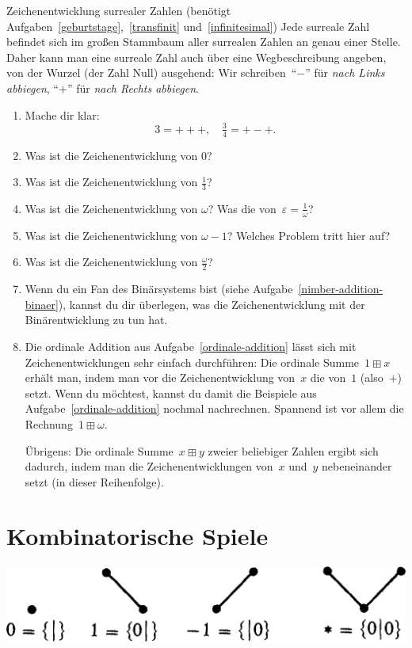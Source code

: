 \documentclass{../zirkelblatt}
\newcommand{\head}[1]{\section*{\rmfamily #1}}%
\begin{document}
\begin{aufgabe}{Zeichenentwicklung surrealer Zahlen
(benötigt Aufgaben~\ref{geburtstage},~\ref{transfinit}
und~\ref{infinitesimal})}
Jede surreale Zahl befindet sich im großen Stammbaum aller surrealen Zahlen an
genau einer Stelle. Daher kann man eine surreale Zahl auch über eine
Wegbeschreibung angeben, von der Wurzel (der Zahl Null) ausgehend: Wir
schreiben~"`$-$"' für \emph{nach Links abbiegen}, "`$+$"' für \emph{nach Rechts
abbiegen}.
\begin{enumerate}
\item Mache dir klar:
\[ 3 = {+}{+}{+}, \quad \tfrac{3}{4} = {+}{-}{+}. \]
\item Was ist die Zeichenentwicklung von $0$?
\item Was ist die Zeichenentwicklung von $\tfrac{1}{3}$?
\item Was ist die Zeichenentwicklung von $\omega$? Was die von~$\varepsilon =
\tfrac{1}{\omega}$?
\item Was ist die Zeichenentwicklung von $\omega-1$? Welches Problem tritt hier
auf?
\item Was ist die Zeichenentwicklung von $\tfrac{\omega}{2}$?
\item Wenn du ein Fan des Binärsystems bist (siehe
Aufgabe~\ref{nimber-addition-binaer}), kannst du dir überlegen, was die
Zeichenentwicklung mit der Binärentwicklung zu tun hat.
\item Die ordinale Addition aus Aufgabe~\ref{ordinale-addition} lässt sich mit
Zeichenentwicklungen sehr einfach durchführen: Die ordinale Summe~$1 \boxplus
x$ erhält man, indem man vor die Zeichenentwicklung von~$x$ die von~$1$
(also~${+}$) setzt. Wenn du möchtest, kannst du damit die Beispiele aus
Aufgabe~\ref{ordinale-addition} nochmal nachrechnen. Spannend ist vor allem die
Rechnung~$1 \boxplus \omega$.

Übrigens: Die ordinale Summe~$x \boxplus y$ zweier beliebiger Zahlen ergibt
sich dadurch, indem man die Zeichenentwicklungen von~$x$ und~$y$ nebeneinander
setzt (in dieser Reihenfolge).
\end{enumerate}
\end{aufgabe}


\head{Kombinatorische Spiele}

\begin{center}\includegraphics[scale=0.2]{einfache-spiele}\end{center}
\end{document}
